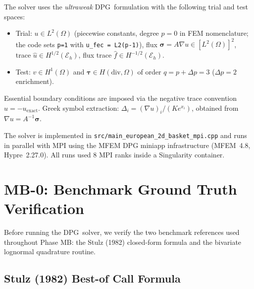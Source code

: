 \documentclass[11pt,a4paper]{article}
\newcommand{\dpg}{\textsc{DPG}}
\begin{document}
The solver uses the \textit{ultraweak} \dpg\ formulation with the following
trial and test spaces:
\begin{itemize}
  \item Trial: $u \in L^2(\Omega)$ (piecewise constants, degree $p=0$ in
        FEM nomenclature; the code sets \texttt{p=1} with
        \texttt{u\_fec = L2(p-1)}), flux $\boldsymbol\sigma = A\nabla u\in [L^2(\Omega)]^2$,
        trace $\hat u\in H^{1/2}(\mathcal{E}_h)$, flux trace
        $\hat f\in H^{-1/2}(\mathcal{E}_h)$.
  \item Test: $v\in H^1(\Omega)$ and $\boldsymbol\tau\in H(\mathrm{div},\Omega)$
        of order $q = p + \Delta p = 3$ ($\Delta p = 2$ enrichment).
\end{itemize}
Essential boundary conditions are imposed via the negative trace convention
$\hat u = -u_{\mathrm{exact}}$.  Greek symbol extraction:
$\Delta_i = (\nabla u)_i / (K e^{x_i})$, obtained from $\nabla u = A^{-1}\boldsymbol\sigma$.

The solver is implemented in
\texttt{src/main\_european\_2d\_basket\_mpi.cpp} and runs in parallel with
MPI using the MFEM DPG miniapp infrastructure (MFEM~4.8, Hypre~2.27.0).
All runs used 8 MPI ranks inside a Singularity container.

\section{MB-0: Benchmark Ground Truth Verification}
\label{sec:mb0}

Before running the \dpg\ solver, we verify the two benchmark references
used throughout Phase MB: the Stulz (1982) closed-form formula and the
bivariate lognormal quadrature routine.

\subsection{Stulz (1982) Best-of Call Formula}
\end{document}
